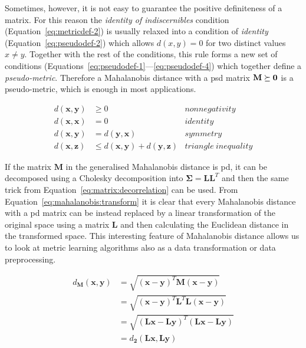 \documentclass[12pt,a4paper]{report}
\begin{document}
Sometimes, however, it is not easy to guarantee the positive definiteness of a matrix. For this reason the \textit{identity of indiscernibles} condition (Equation~\ref{eq:metricdef-2}) is usually relaxed into a condition of \textit{identity} (Equation~\ref{eq:pseudodef-2}) which allows $d(x,y)=0$ for two distinct values $x \neq y$. Together with the rest of the conditions, this rule forms a new set of conditions (Equations~\ref{eq:pseudodef-1}---\ref{eq:pseudodef-4}) which together define a \textit{pseudo-metric}. Therefore a Mahalanobis distance with a \ac{psd} matrix $\bf{M} \succeq 0$ is a pseudo-metric, which is enough in most applications.

\begin{align}
d(\textbf{x},\textbf{y}) &\geq 0 & nonnegativity \label{eq:pseudodef-1} \\
d(\textbf{x},\textbf{x}) &= 0 & identity \label{eq:pseudodef-2} \\
d(\textbf{x},\textbf{y}) &= d(\textbf{y},\textbf{x}) & symmetry \label{eq:pseudodef-3} \\
d(\textbf{x},\textbf{z}) &\leq d(\textbf{x},\textbf{y}) + d(\textbf{y},\textbf{z}) & triangle \ inequality \label{eq:pseudodef-4}
\end{align} 

If the matrix $\bm{M}$ in the generalised Mahalanobis distance is \ac{pd}, it can be decomposed using a Cholesky decomposition into $\bm{\Sigma}=\bm{L}\bm{L}^T$ and then the same trick from Equation~\ref{eq:matrix:decorrelation} can be used. From Equation~\ref{eq:mahalanobis:transform} it is clear that every Mahalanobis distance with a \ac{pd} matrix can be instead replaced by a linear transformation of the original space using a matrix $\bm{L}$ and then calculating the Euclidean distance in the transformed space. This interesting feature of Mahalanobis distance allows us to look at metric learning algorithms also as a data transformation or data preprocessing.

\begin{align}
  d_{\bm{M}}(\textbf{x},\textbf{y}) &= \sqrt{(\textbf{x}-\textbf{y})^{T}\bm{M}(\textbf{x}-\textbf{y})} \nonumber\\
         &= \sqrt{(\textbf{x}-\textbf{y})^{T}\bm{L}^{T}\bm{L}(\textbf{x}-\textbf{y})} \nonumber\\
         &= \sqrt{(\bm{L}\textbf{x}-\bm{L}\textbf{y})^{T}(\bm{L}\textbf{x}-\bm{L}\textbf{y})} \nonumber\\
         &= d_{\bm{2}}(\bm{L}\textbf{x}, \bm{L}\textbf{y}) \label{eq:mahalanobis:transform}
\end{align}
\end{document}

